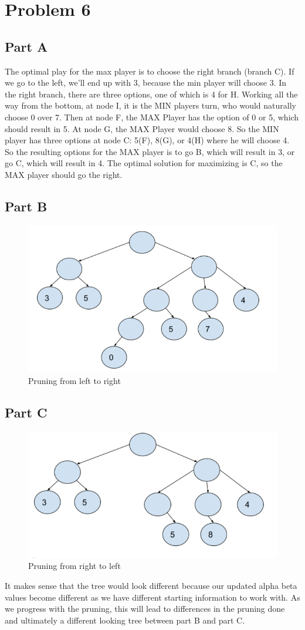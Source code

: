 \documentclass[12pt]{article}
\begin{document}
	\section*{Problem 6}
		\subsection*{Part A}
			The optimal play for the max player is to choose the right branch (branch C). If we go to the left, we’ll end up with 3, because the min player will choose 3. In the right branch, there are three options, one of which is 4 for H. Working all the way from the bottom, at node I, it is the MIN players turn, who would naturally choose 0 over 7. Then at node F, the MAX Player has the option of 0 or 5, which should result in 5. At node G, the MAX Player would choose 8. So the MIN player has three options at node C: 5(F), 8(G), or 4(H) where he will choose 4. So the resulting options for the MAX player is to go B, which will result in 3, or go C, which will result in 4. The optimal solution for maximizing is C, so the MAX player should go the right.
		\subsection*{Part B} 
			\begin{figure}[!htb]
				\centering
				\includegraphics[width=.5\textwidth]{Question6a.png}
				\caption{Pruning from left to right}
			\end{figure}
		\subsection*{Part C}
			\begin{figure}[!htb]
				\centering
				\includegraphics[width=.5\textwidth]{Question6b.png}
				\caption{Pruning from right to left}
			\end{figure}
			It makes sense that the tree would look different because our updated alpha beta values become different as we have different starting information to work with. As we progress with the pruning, this will lead to differences in the pruning done and ultimately a different looking tree between part B and part C.
			
\end{document}
